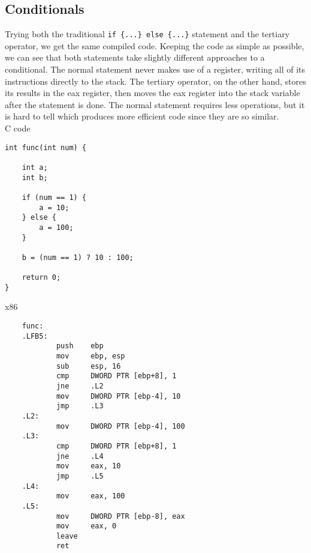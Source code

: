\documentclass[11pt]{article}
\begin{document}
\subsection*{Conditionals}
Trying both the traditional \texttt{if \{...\} else \{...\}} statement and the tertiary operator, we get the same compiled code. Keeping the code as simple as possible, we can see that both statements take slightly different approaches to a conditional. The normal statement never makes use of a register, writing all of its instructions directly to the stack. The tertiary operator, on the other hand, stores its results in the eax register, then moves the eax register into the stack variable after the statement is done. The normal statement requires less operations, but it is hard to tell which produces more efficient code since they are so similar. \\
C code
\begin{lstlisting}
int func(int num) {

    int a;
    int b;

    if (num == 1) {
        a = 10;
    } else {
        a = 100;
    }

    b = (num == 1) ? 10 : 100;

    return 0;
}

\end{lstlisting}

x86
\begin{lstlisting}
    func:
    .LFB5:
            push    ebp
            mov     ebp, esp
            sub     esp, 16
            cmp     DWORD PTR [ebp+8], 1
            jne     .L2
            mov     DWORD PTR [ebp-4], 10
            jmp     .L3
    .L2:
            mov     DWORD PTR [ebp-4], 100
    .L3:
            cmp     DWORD PTR [ebp+8], 1
            jne     .L4
            mov     eax, 10
            jmp     .L5
    .L4:
            mov     eax, 100
    .L5:
            mov     DWORD PTR [ebp-8], eax
            mov     eax, 0
            leave
            ret
\end{lstlisting}
\end{document}
